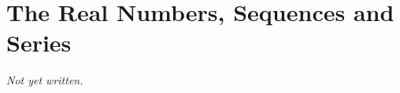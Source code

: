 \chapter{The Real Numbers, Sequences and Series}\label{ch:real-numbers-sequences-series}


\textit{Not yet written.}
